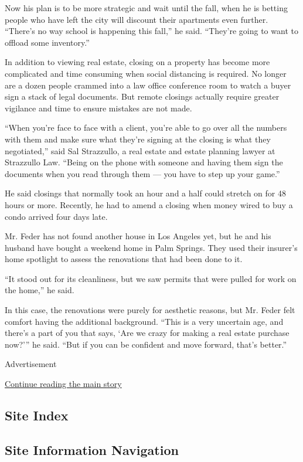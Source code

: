 Now his plan is to be more strategic and wait until the fall, when he is
betting people who have left the city will discount their apartments
even further. ``There's no way school is happening this fall,'' he said.
``They're going to want to offload some inventory.''

In addition to viewing real estate, closing on a property has become
more complicated and time consuming when social distancing is required.
No longer are a dozen people crammed into a law office conference room
to watch a buyer sign a stack of legal documents. But remote closings
actually require greater vigilance and time to ensure mistakes are not
made.

``When you're face to face with a client, you're able to go over all the
numbers with them and make sure what they're signing at the closing is
what they negotiated,'' said Sal Strazzullo, a real estate and estate
planning lawyer at Strazzullo Law. ``Being on the phone with someone and
having them sign the documents when you read through them --- you have
to step up your game.''

He said closings that normally took an hour and a half could stretch on
for 48 hours or more. Recently, he had to amend a closing when money
wired to buy a condo arrived four days late.

Mr. Feder has not found another house in Los Angeles yet, but he and his
husband have bought a weekend home in Palm Springs. They used their
insurer's home spotlight to assess the renovations that had been done to
it.

``It stood out for its cleanliness, but we saw permits that were pulled
for work on the home,'' he said.

In this case, the renovations were purely for aesthetic reasons, but Mr.
Feder felt comfort having the additional background. ``This is a very
uncertain age, and there's a part of you that says, `Are we crazy for
making a real estate purchase now?''' he said. ``But if you can be
confident and move forward, that's better.''

Advertisement

\protect\hyperlink{after-bottom}{Continue reading the main story}

\hypertarget{site-index}{%
\subsection{Site Index}\label{site-index}}

\hypertarget{site-information-navigation}{%
\subsection{Site Information
Navigation}\label{site-information-navigation}}


